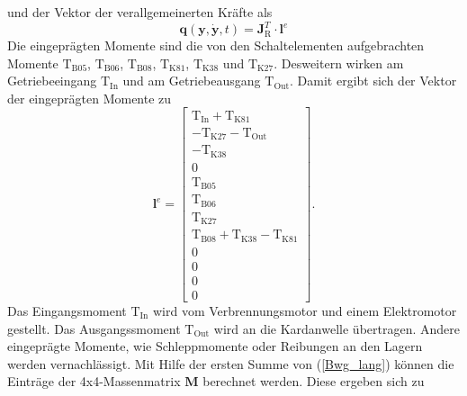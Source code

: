 und der Vektor der verallgemeinerten Kräfte als
  \begin{equation}
\pmb{q}(\pmb{y},\dot{\pmb{y}},t) = \pmb{J}_\mathrm{R}^T\cdot\mathrm{\pmb{l}}^e 
\end{equation}
Die eingeprägten Momente sind die von den Schaltelementen aufgebrachten Momente $\mathrm{T}_{\mathrm{B05}}$, $\mathrm{T}_{\mathrm{B06}}$, $\mathrm{T}_{\mathrm{B08}}$, $\mathrm{T}_{\mathrm{K81}}$, $\mathrm{T}_{\mathrm{K38}}$ und $\mathrm{T}_{\mathrm{K27}}$. Desweitern wirken am Getriebeeingang $\mathrm{T}_{\mathrm{In}}$ und am Getriebeausgang $\mathrm{T}_{\mathrm{Out}}$. Damit ergibt sich der Vektor der eingeprägten Momente zu
\begin{equation}\label{eq:le}
\mathrm{\pmb{l}}^e = \begin{bmatrix} \mathrm{T}_{\mathrm{In}}+\mathrm{T}_{\mathrm{K81}} \\ -\mathrm{T}_{\mathrm{K27}}-\mathrm{T}_{\mathrm{Out}} \\ -\mathrm{T}_{\mathrm{K38}} \\ 0 \\ \mathrm{T}_{\mathrm{B05}} \\ \mathrm{T}_{\mathrm{B06}} \\ \mathrm{T}_{\mathrm{K27}} \\ \mathrm{T}_{\mathrm{B08}}+\mathrm{T}_{\mathrm{K38}}-\mathrm{T}_{\mathrm{K81}} \\ 0 \\ 0 \\ 0 \\ 0 \end{bmatrix}.
\end{equation}
Das Eingangsmoment $\mathrm{T}_{\mathrm{In}}$ wird vom Verbrennungsmotor und einem Elektromotor gestellt. Das Ausgangssmoment $\mathrm{T}_{\mathrm{Out}}$ wird an die Kardanwelle übertragen. Andere eingeprägte Momente, wie Schleppmomente oder Reibungen an den Lagern werden vernachlässigt. Mit Hilfe der ersten Summe von (\ref{Bwg_lang}) können die Einträge der 4x4-Massenmatrix $\pmb{M}$ berechnet werden. Diese ergeben sich zu
